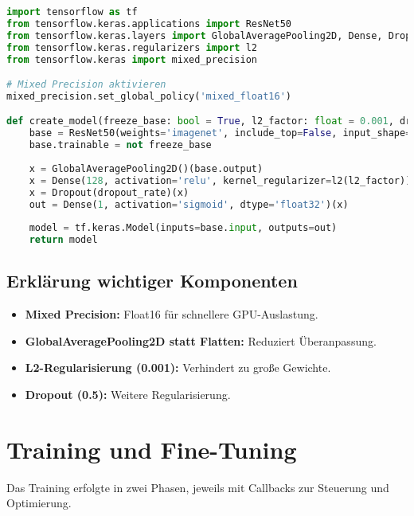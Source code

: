 \begin{lstlisting}[language=Python, caption=Definition in \texttt{train\_model.py}]
import tensorflow as tf
from tensorflow.keras.applications import ResNet50
from tensorflow.keras.layers import GlobalAveragePooling2D, Dense, Dropout
from tensorflow.keras.regularizers import l2
from tensorflow.keras import mixed_precision

# Mixed Precision aktivieren
mixed_precision.set_global_policy('mixed_float16')

def create_model(freeze_base: bool = True, l2_factor: float = 0.001, dropout_rate: float = 0.5):
    base = ResNet50(weights='imagenet', include_top=False, input_shape=(256,256,3))
    base.trainable = not freeze_base
    
    x = GlobalAveragePooling2D()(base.output)
    x = Dense(128, activation='relu', kernel_regularizer=l2(l2_factor))(x)
    x = Dropout(dropout_rate)(x)
    out = Dense(1, activation='sigmoid', dtype='float32')(x)
    
    model = tf.keras.Model(inputs=base.input, outputs=out)
    return model
\end{lstlisting}

\subsection*{Erklärung wichtiger Komponenten}
\begin{itemize}
  \item \textbf{Mixed Precision:} Float16 für schnellere GPU-Auslastung.
  \item \textbf{GlobalAveragePooling2D statt Flatten:} Reduziert Überanpassung.
  \item \textbf{L2-Regularisierung (0.001):} Verhindert zu große Gewichte.
  \item \textbf{Dropout (0.5):} Weitere Regularisierung.
\end{itemize}

\section{Training und Fine-Tuning}
Das Training erfolgte in zwei Phasen, jeweils mit Callbacks zur Steuerung und Optimierung.

